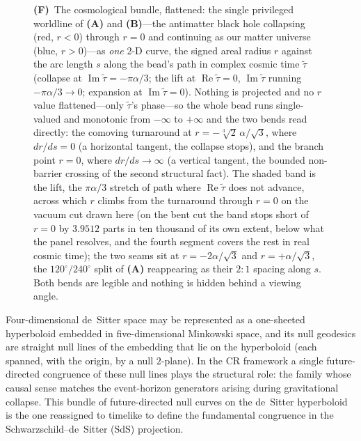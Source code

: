 \documentclass[11pt,a4paper]{article}
\theoremstyle{plain}
\theoremstyle{definition}
\theoremstyle{remark}
\begin{document}
\begin{figure}[htbp]
{\textbf{(F)}~The cosmological bundle, flattened: the single privileged worldline of \textbf{(A)} and \textbf{(B)}---the antimatter black hole collapsing (red, $r<0$) through $r=0$ and continuing as our matter universe (blue, $r>0$)---as \emph{one} 2-D curve, the signed areal radius $r$ against the arc length $s$ along the bead's path in complex cosmic time $\tilde\tau$ (collapse at $\operatorname{Im}\tilde\tau=-\pi\alpha/3$; the lift at $\operatorname{Re}\tilde\tau=0$, $\operatorname{Im}\tilde\tau$ running $-\pi\alpha/3\to0$; expansion at $\operatorname{Im}\tilde\tau=0$). Nothing is projected and no $r$ value flattened---only $\tilde\tau$'s phase---so the whole bead runs single-valued and monotonic from $-\infty$ to $+\infty$ and the two bends read directly: the comoving turnaround at $r=-\sqrt[3]{2}\,\alpha/\sqrt3$, where $dr/ds=0$ (a horizontal tangent, the collapse stops), and the branch point $r=0$, where $dr/ds\to\infty$ (a vertical tangent, the bounded non-barrier crossing of the second structural fact). The shaded band is the lift, the $\pi\alpha/3$ stretch of path where $\operatorname{Re}\tilde\tau$ does not advance, across which $r$ climbs from the turnaround through $r=0$ on the vacuum cut drawn here (on the bent cut the band stops short of $r=0$ by $3.9512$ parts in ten thousand of its own extent, below what the panel resolves, and the fourth segment covers the rest in real cosmic time); the two seams sit at $r=-2\alpha/\sqrt3$ and $r=+\alpha/\sqrt3$, the $120^\circ/240^\circ$ split of \textbf{(A)} reappearing as their $2{:}1$ spacing along $s$. Both bends are legible and nothing is hidden behind a viewing angle.}
    \label{fig:dS_SdS}
\end{figure}

Four-dimensional de~Sitter space \cite{deSitter1917} may be represented as a one-sheeted hyperboloid embedded in five-dimensional Minkowski space, and its null geodesics are straight null lines of the embedding that lie on the hyperboloid (each spanned, with the origin, by a null $2$-plane). In the CR framework a single future-directed congruence of these null lines plays the structural role: the family whose causal sense matches the event-horizon generators arising during gravitational collapse. This bundle of future-directed null curves on the de~Sitter hyperboloid is the one reassigned to timelike to define the fundamental congruence in the Schwarzschild--de~Sitter (SdS) projection.
\end{document}
